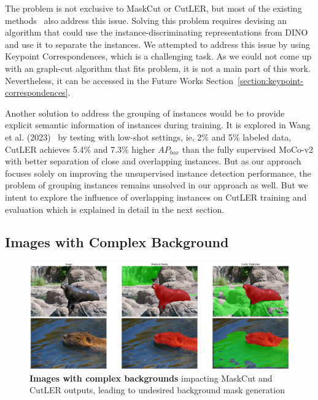 The problem is not exclusive to MaskCut or CutLER, but most of the existing methods~\cite{engstler2023understanding, cond1_support_2, Wang_2022_CVPR} also address this issue. Solving this problem requires devising an algorithm that could use the instance-discriminating representations from DINO and use it to separate the instances. We attempted to address this issue by using Keypoint Correspondences, which is a challenging task. As we could not come up with an graph-cut algorithm that fits problem, it is not a main part of this work. Nevertheless, it can be accessed in the Future Works Section~\ref{section:keypoint-correspondences}.

Another solution to address the grouping of instances would be to provide explicit semantic information of instances during training. It is explored in Wang et al. (2023)~\cite{wang2023cut} by testing with low-shot settings, ie, 2\% and 5\% labeled data, CutLER achieves 5.4\% and 7.3\% higher \(AP_{box}\) than the fully supervised MoCo-v2 with better separation of close and overlapping instances. But as our approach focuses solely on improving the unsupervised instance detection performance, the problem of grouping instances remains unsolved in our approach as well. But we intent to explore the influence of overlapping instances on CutLER training and evaluation which is explained in detail in the next section.


\subsection{Images with Complex Background}
\label{section:images_with complex_backgrounds}
\begin{figure}
	\centering
	\includegraphics[width=1\textwidth]{Images/main/cutler-prob-noisy-bg.png}
	\caption[\textbf{Cutler's Performance on Images with Complex Background}]{\textbf{Images with complex backgrounds} impacting MaskCut and CutLER outputs, leading to undesired background mask generation}
	\label{fig:cutler_noisy_bg_eg}
\end{figure}

